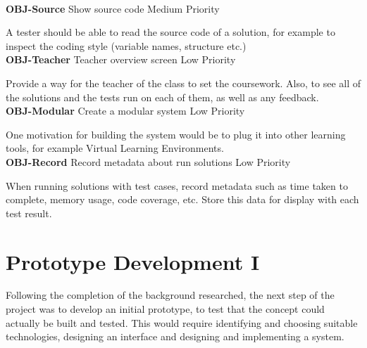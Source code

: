 \documentclass[a4paper,11pt]{report}
\newcommand{\objitem}[4]{\textbf{\\OBJ-#1} \quad #2 \hfill #3\par#4}
\begin{document}
\objitem{Source}{Show source code}{Medium Priority}{A tester should be able to read the source code of a solution, for example to inspect the coding style (variable names, structure etc.)}
\objitem{Teacher}{Teacher overview screen}{Low Priority}{Provide a way for the teacher of the class to set the coursework. Also, to see all of the solutions and the tests run on each of them, as well as any feedback.}
\objitem{Modular}{Create a modular system}{Low Priority}{One motivation for building the system would be to plug it into other learning tools, for example Virtual Learning Environments.}
\objitem{Record}{Record metadata about run solutions}{Low Priority}{When running solutions with test cases, record metadata such as time taken to complete, memory usage, code coverage, etc. Store this data for display with each test result.}



\chapter{Prototype Development I}
\label{ch:proto1}
Following the completion of the background researched, the next step of the project was to develop an initial prototype, to test that the concept could actually be built and tested. This would require identifying and choosing suitable technologies, designing an interface and designing and implementing a system.
\end{document}
